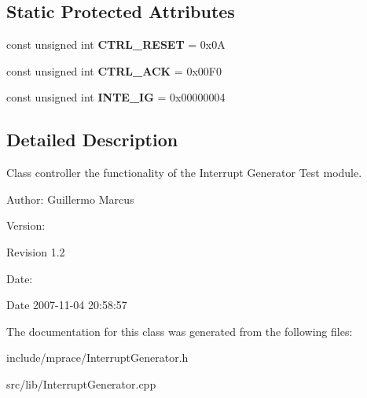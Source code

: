 \subsection*{Static Protected Attributes}
\begin{CompactItemize}
\item 
\hypertarget{classmprace_1_1InterruptGenerator_t0}{
const unsigned int {\bf CTRL\_\-RESET} = 0x0A}
\label{classmprace_1_1InterruptGenerator_t0}

\item 
\hypertarget{classmprace_1_1InterruptGenerator_t1}{
const unsigned int {\bf CTRL\_\-ACK} = 0x00F0}
\label{classmprace_1_1InterruptGenerator_t1}

\item 
\hypertarget{classmprace_1_1InterruptGenerator_t2}{
const unsigned int {\bf INTE\_\-IG} = 0x00000004}
\label{classmprace_1_1InterruptGenerator_t2}

\end{CompactItemize}


\subsection{Detailed Description}
Class controller the functionality of the Interrupt Generator Test module. 

\begin{Desc}
\item[Author:]Guillermo Marcus \end{Desc}
\begin{Desc}
\item[Version:]\begin{Desc}
\item[Revision]1.2 \end{Desc}
\end{Desc}
\begin{Desc}
\item[Date:]\begin{Desc}
\item[Date]2007-11-04 20:58:57 \end{Desc}
\end{Desc}




The documentation for this class was generated from the following files:\begin{CompactItemize}
\item 
include/mprace/Interrupt\-Generator.h\item 
src/lib/Interrupt\-Generator.cpp\end{CompactItemize}
